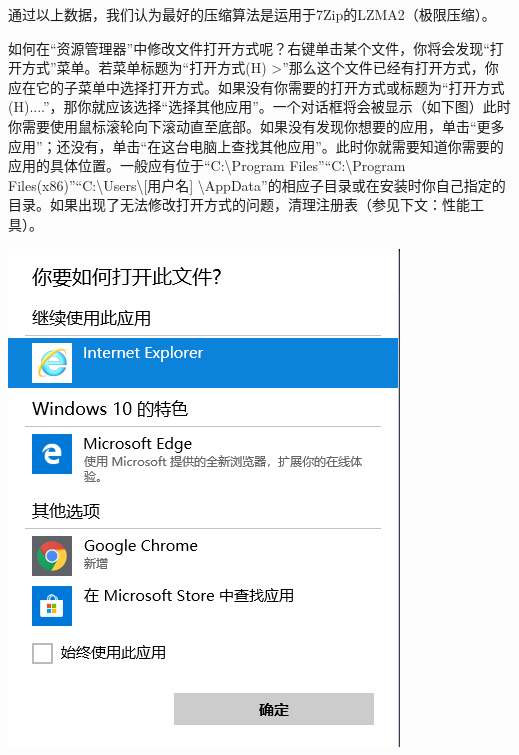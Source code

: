 \documentclass{book}
\begin{document}
通过以上数据，我们认为最好的压缩算法是运用于7Zip的LZMA2（极限压缩）。\par
如何在“资源管理器”中修改文件打开方式呢？右键单击某个文件，你将会发现“打开方式”菜单。若菜单标题为“打开方式(H)    >”那么这个文件已经有打开方式，你应在它的子菜单中选择打开方式。如果没有你需要的打开方式或标题为“打开方式(H)....”，那你就应该选择“选择其他应用”。一个对话框将会被显示（如下图）此时你需要使用鼠标滚轮向下滚动直至底部。如果没有发现你想要的应用，单击“更多应用”；还没有，单击“在这台电脑上查找其他应用”。此时你就需要知道你需要的应用的具体位置。一般应有位于“C:\textbackslash Program Files”“C:\textbackslash Program Files(x86)”“C:\textbackslash Users\textbackslash [用户名] \textbackslash AppData”的相应子目录或在安装时你自己指定的目录。{\color{red}{为了避免这个问题，你需要在安装程序时记下安装位置。}}如果出现了无法修改打开方式的问题，清理注册表（参见下文：性能工具）。
\begin{center}
	\includegraphics[scale=0.5]{pic/htopen}
\end{center}
\end{document}
